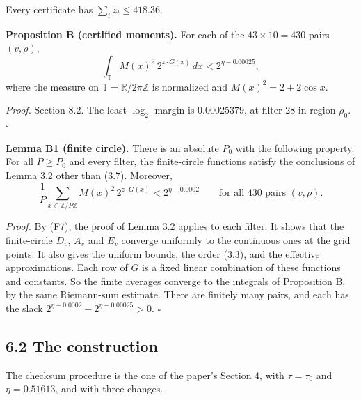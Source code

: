 \documentclass[10pt,a4paper]{article}
\begin{document}
Every certificate has $\sum_tz_t \le 418.36$.

\textbf{Proposition B (certified moments).} For each of the $43\times10 = 430$ pairs $(v, \rho)$,
\[\int_{\mathbb T}M(x)^2\,2^{z\cdot G(x)}\,dx < 2^{\eta - 0.00025},\]
where the measure on $\mathbb T = \mathbb R/2\pi\mathbb Z$ is normalized and $M(x)^2 = 2 + 2\cos x$.

\emph{Proof.} Section 8.2. The least $\log_2$ margin is $0.00025379$, at filter 28 in region $\rho_0$. $\square$

\textbf{Lemma B1 (finite circle).} There is an absolute $P_0$ with the following property. For all $P \ge P_0$ and every
filter, the finite-circle functions satisfy the conclusions of Lemma 3.2 other than (3.7). Moreover,
\[\frac1P\sum_{x\in\mathbb Z/P\mathbb Z}M(x)^2\,2^{z\cdot G(x)} < 2^{\eta - 0.0002}\qquad\text{for all 430 pairs } (v,\rho).\]

\emph{Proof.} By (F7), the proof of Lemma 3.2 applies to each filter. It shows that the finite-circle $D_v$, $A_v$ and $E_v$
converge uniformly to the continuous ones at the grid points. It also gives the uniform bounds, the order (3.3), and the
effective approximations. Each row of $G$ is a fixed linear combination of these functions and constants. So the finite
averages converge to the integrals of Proposition B, by the same Riemann-sum estimate. There are finitely many pairs, and
each has the slack $2^{\eta - 0.0002} - 2^{\eta - 0.00025} > 0$. $\square$

\subsection*{6.2 The construction}

The checksum procedure is the one of the paper's Section 4, with $\tau = \tau_0$ and $\eta = 0.51613$, and with three
changes.
\end{document}
